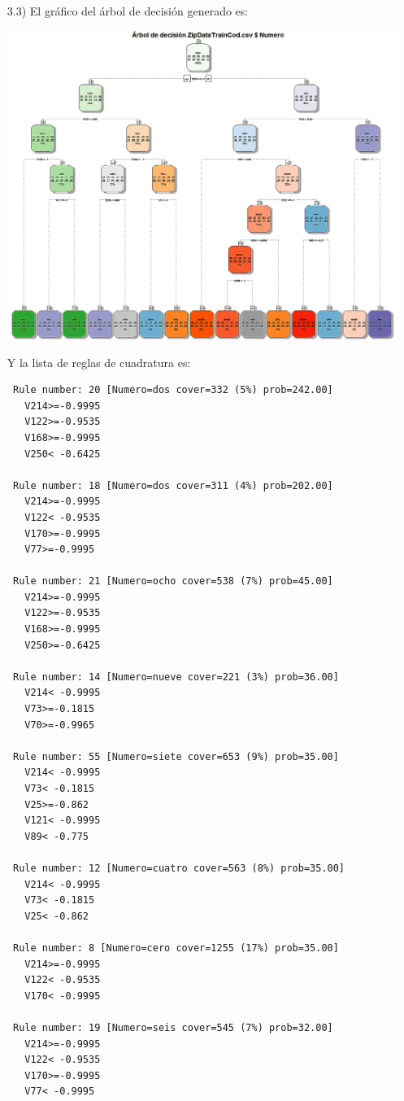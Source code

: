 \documentclass[11pt,a4paper]{report}
\begin{document}
\begin{itemize}
\item[3.3)] El gráfico del árbol de decisión generado es:
\begin{center}
\includegraphics[scale=0.5]{arbol3.png}
\end{center}
Y la lista de reglas de cuadratura es:
\begin{verbatim}
 Rule number: 20 [Numero=dos cover=332 (5%) prob=242.00]
   V214>=-0.9995
   V122>=-0.9535
   V168>=-0.9995
   V250< -0.6425

 Rule number: 18 [Numero=dos cover=311 (4%) prob=202.00]
   V214>=-0.9995
   V122< -0.9535
   V170>=-0.9995
   V77>=-0.9995

 Rule number: 21 [Numero=ocho cover=538 (7%) prob=45.00]
   V214>=-0.9995
   V122>=-0.9535
   V168>=-0.9995
   V250>=-0.6425

 Rule number: 14 [Numero=nueve cover=221 (3%) prob=36.00]
   V214< -0.9995
   V73>=-0.1815
   V70>=-0.9965

 Rule number: 55 [Numero=siete cover=653 (9%) prob=35.00]
   V214< -0.9995
   V73< -0.1815
   V25>=-0.862
   V121< -0.9995
   V89< -0.775

 Rule number: 12 [Numero=cuatro cover=563 (8%) prob=35.00]
   V214< -0.9995
   V73< -0.1815
   V25< -0.862

 Rule number: 8 [Numero=cero cover=1255 (17%) prob=35.00]
   V214>=-0.9995
   V122< -0.9535
   V170< -0.9995

 Rule number: 19 [Numero=seis cover=545 (7%) prob=32.00]
   V214>=-0.9995
   V122< -0.9535
   V170>=-0.9995
   V77< -0.9995


\end{verbatim}
\end{itemize}
\end{document}
